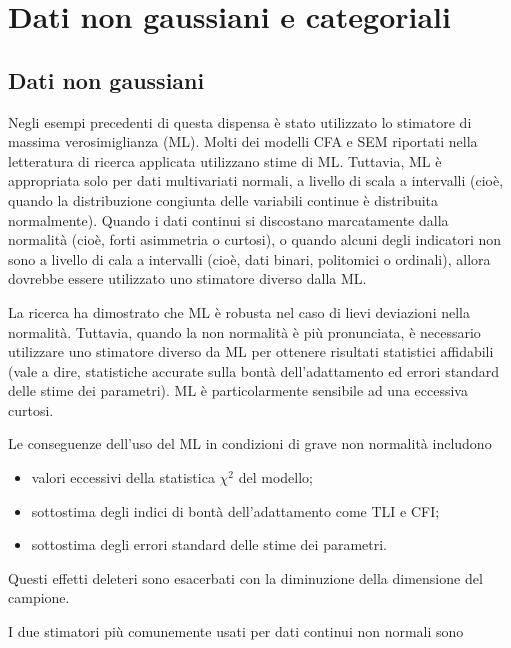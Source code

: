 \documentclass[
  11pt,
]{krantz}
\providecommand{\tightlist}{%
  \setlength{\itemsep}{0pt}\setlength{\parskip}{0pt}}
\theoremstyle{definition}
\theoremstyle{definition}
\theoremstyle{definition}
\theoremstyle{definition}
\theoremstyle{remark}
\begin{document}
\hypertarget{ch:cat_data}{%
\chapter{Dati non gaussiani e categoriali}\label{ch:cat_data}}

\hypertarget{dati-non-gaussiani}{%
\section{Dati non gaussiani}\label{dati-non-gaussiani}}

Negli esempi precedenti di questa dispensa è stato utilizzato lo stimatore di massima verosimiglianza (ML). Molti dei modelli CFA e SEM riportati nella letteratura di ricerca applicata utilizzano stime di ML. Tuttavia, ML è appropriata solo per dati multivariati normali, a livello di scala a intervalli (cioè, quando la distribuzione congiunta delle variabili continue è distribuita normalmente). Quando i dati continui si discostano marcatamente dalla normalità (cioè, forti asimmetria o curtosi), o quando alcuni degli indicatori non sono a livello di cala a intervalli (cioè, dati binari, politomici o ordinali), allora dovrebbe essere utilizzato uno stimatore diverso dalla ML.

La ricerca ha dimostrato che ML è robusta nel caso di lievi deviazioni nella normalità. Tuttavia, quando la non normalità è più pronunciata, è necessario utilizzare uno stimatore diverso da ML per ottenere risultati statistici affidabili (vale a dire, statistiche accurate sulla bontà dell'adattamento ed errori standard delle stime dei parametri). ML è particolarmente sensibile ad una eccessiva curtosi.

Le conseguenze dell'uso del ML in condizioni di grave non normalità includono

\begin{itemize}
\tightlist
\item
  valori eccessivi della statistica \(\chi^2\) del modello;
\item
  sottostima degli indici di bontà dell'adattamento come TLI e CFI;
\item
  sottostima degli errori standard delle stime dei parametri.
\end{itemize}

Questi effetti deleteri sono esacerbati con la diminuzione della dimensione del campione.

I due stimatori più comunemente usati per dati continui non normali sono
\end{document}
